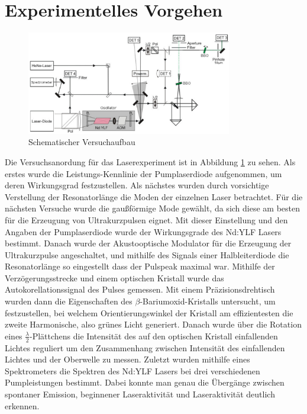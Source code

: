 \section{Experimentelles Vorgehen}
\begin{figure}[]
  \centering
  \includegraphics[width = 0.8\textwidth]{Bilder/Versuchsaufbau.png}
  \caption{Schematischer Versuchaufbau}
  \label{fig:versuchsaufbau}
\end{figure}
Die Versuchsanordung für das Laserexperiment ist in Abbildung \ref{fig:versuchsaufbau}
zu sehen. Als erstes wurde die Leistungs-Kennlinie der Pumplaserdiode aufgenommen, um deren Wirkungsgrad festzustellen.
Als nächstes wurden durch vorsichtige Verstellung der Resonatorlänge die Moden der einzelnen Laser betrachtet.
Für die nächsten Versuche wurde die gaußförmige Mode gewählt, da sich diese am besten für
die Erzeugung von Ultrakurzpulsen eignet.
Mit dieser Einstellung und den Angaben der Pumplaserdiode wurde der
Wirkungsgrade des Nd:YLF Lasers bestimmt. 
Danach wurde der Akustooptische Modulator für die Erzeugung der Ultrakurzpulse angeschaltet, und mithilfe des Signals einer Halbleiterdiode die Resonatorlänge so eingestellt dass der Pulspeak maximal war.
Mithilfe der Verzögerungsstrecke und einem optischen Kristall wurde das Autokorellationssignal des Pulses gemessen.
Mit einem Präzisionsdrehtisch wurden dann die Eigenschaften des $\beta$-Bariumoxid-Kristalls untersucht, um festzustellen, bei welchem Orientierungswinkel der Kristall am effizientesten die zweite Harmonische, also grünes Licht generiert.
Danach wurde über die Rotation eines $\frac{\lambda}{2}$-Plättchens die Intensität des auf den optischen Kristall einfallenden Lichtes reguliert um den Zusammenhang zwischen Intensität des einfallenden Lichtes und der Oberwelle zu messen.
Zuletzt wurden mithilfe eines Spektrometers die Spektren des Nd:YLF Lasers bei drei verschiedenen Pumpleistungen bestimmt. Dabei konnte man genau die Übergänge zwischen spontaner Emission, beginnener Laseraktivität und Laseraktivität deutlich erkennen.

